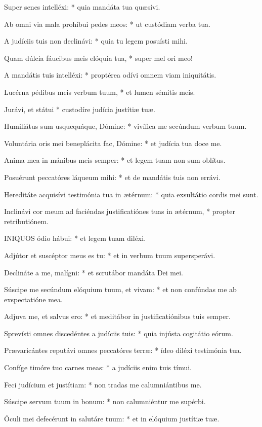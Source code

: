 Super senes intelléxi: * quia mandáta tua quæsívi.

Ab omni via mala prohíbui pedes meos: * ut custódiam verba tua.

A judíciis tuis non declinávi: * quia tu legem posuísti mihi.

Quam dúlcia fáucibus meis elóquia tua, * super mel ori meo!

A mandátis tuis intelléxi: * proptérea odívi omnem viam iniquitátis.

Lucérna pédibus meis verbum tuum, * et lumen sémitis meis.

Jurávi, et státui * custodíre judícia justítiæ tuæ.

Humiliátus sum usquequáque, Dómine: * vivífica me secúndum verbum tuum.

Voluntária oris mei beneplácita fac, Dómine: * et judícia tua doce me.

Anima mea in mánibus meis semper: * et legem tuam non sum oblítus.

Posuérunt peccatóres láqueum mihi: * et de mandátis tuis non errávi.

Hereditáte acquisívi testimónia tua in ætérnum: * quia exsultátio cordis mei sunt.

Inclinávi cor meum ad faciéndas justificatiónes tuas in ætérnum, * propter retributiónem.


\lettrine[lines=2]{I}{NIQUOS} ódio hábui: * et legem tuam diléxi.

Adjútor et suscéptor meus es tu: * et in verbum tuum supersperávi.

Declináte a me, malígni: * et scrutábor mandáta Dei mei.

Súscipe me secúndum elóquium tuum, et vivam: * et non confúndas me ab exspectatióne mea.

Adjuva me, et salvus ero: * et meditábor in justificatiónibus tuis semper.

Sprevísti omnes discedéntes a judíciis tuis: * quia injústa cogitátio eórum.

Prævaricántes reputávi omnes peccatóres terræ: * ídeo diléxi testimónia tua.

Confíge timóre tuo carnes meas: * a judíciis enim tuis tímui.

Feci judícium et justítiam: * non tradas me calumniántibus me.

Súscipe servum tuum in bonum: * non calumniéntur me supérbi.

Óculi mei defecérunt in salutáre tuum: * et in elóquium justítiæ tuæ.

